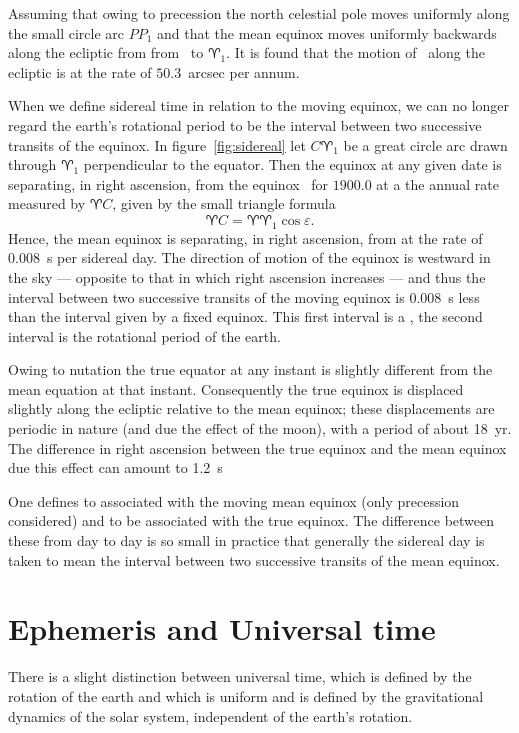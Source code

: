 Assuming that owing to precession the north celestial pole moves uniformly along the 
small circle arc $PP_1$ and that the mean equinox moves uniformly backwards along the 
ecliptic from from \aries\  to $\aries_1$. It is found that the motion of \aries\ along
the ecliptic is at the rate of $50.3$~arcsec per annum.

When we define sidereal time in relation to the moving equinox, we can no longer 
regard the earth's rotational period to be the interval between two successive transits
of the equinox. In figure~\ref{fig:sidereal} let $C\aries_1$ be a great circle arc
drawn through $\aries_1$ perpendicular to the equator. Then the equinox at any given 
date is separating, in right ascension, from the equinox \aries\  for $1900.0$ at a the
annual rate measured by $\aries C$, given by the small triangle formula
\[ 
\aries C=\aries\aries_1\cos\varepsilon.
\]
Hence, the mean equinox is separating, in right ascension, from \aries at the rate
of $0.008$~s per sidereal day. The direction of motion of the equinox is westward 
in the sky --- opposite to that in which right ascension increases --- and thus the 
interval between two successive transits of the moving equinox is $0.008$~s less than 
the interval given by a fixed equinox. This first interval is a {}, 
the second interval is the rotational period of the earth.

Owing to nutation the true equator at any instant is slightly different from the 
mean equation at that instant. Consequently the true equinox is displaced slightly 
along the ecliptic relative to the mean equinox; these displacements are periodic
in nature (and due the effect of the moon), with a period of about 18~yr. 
The difference in right ascension between the true equinox and the mean equinox due 
this effect can amount to 1.2~s

One defines {} to associated with the moving mean equinox 
(only precession considered) and {} to be associated 
with the true equinox. The difference between these from day to day is so small
in practice that generally the sidereal day is taken to mean the interval between
two successive transits of the mean equinox.

\section{Ephemeris and Universal time}

There is a slight distinction between universal time, which is defined by the 
rotation of the earth and {} which is uniform and is defined
by the gravitational dynamics of the solar system, independent of the earth's 
rotation.

